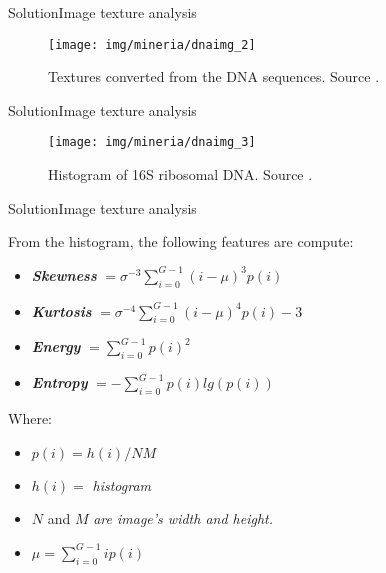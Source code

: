 \documentclass[10pt]{beamer}
\newcommand{\1}{
	\setbeamertemplate{background}{
		\texttt{[image: img/1\_dna]}
		\tikz[overlay] \fill[fill opacity=0.75,fill=white] (0,0) rectangle (-\paperwidth,\paperheight);
	}
}
\begin{document}
\begin{frame}{Solution}{Image texture analysis}
	\begin{figure}[]
		\centering
		\texttt{[image: img/mineria/dnaimg\_2]}
		\label{img:mot2}
		\caption{Textures converted from the DNA sequences. Source \cite{delibacs2020dna}.}
	\end{figure}
\end{frame}

\begin{frame}{Solution}{Image texture analysis}
	\begin{figure}[]
		\centering
		\texttt{[image: img/mineria/dnaimg\_3]}
		\label{img:mot2}
		\caption{Histogram of 16S ribosomal DNA. Source \cite{delibacs2020dna}.}
	\end{figure}
\end{frame}

\begin{frame}{Solution}{Image texture analysis}
	\begin{block}{}
		From the histogram, the following features are compute:
		\begin{itemize}
			\item \textbf{\textit{Skewness}} $ = \sigma^{-3} \sum_{i=0}^{G-1} (i - \mu)^3 p(i)$
			\item \textbf{\textit{Kurtosis}} $ = \sigma^{-4} \sum_{i=0}^{G-1} (i - \mu)^4 p(i)-3$
			\item \textbf{\textit{Energy}} $ = \sum_{i=0}^{G-1} p(i)^2$
			\item \textbf{\textit{Entropy}} $ = -\sum_{i=0}^{G-1} p(i)lg(p(i))$
		\end{itemize}
	\end{block}
	
	\begin{block}{}
		Where: 
		\begin{itemize}	
			\item	$p(i) = h(i)/NM$ 
			\item	$h(i) =$ \textit{histogram} 
			\item	$N$ and $M$ \textit{are image's width and height.} 
			\item	$\mu = \sum_{i=0}^{G-1}ip(i)$
		\end{itemize}
	\end{block}
\end{frame}
\end{document}

